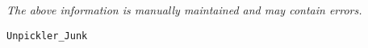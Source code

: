 \label{pkg:unpickler\_junk}

{\tiny \it The above information is manually maintained and may contain errors.}
\begin{verbatim}
Unpickler_Junk
\end{verbatim}
